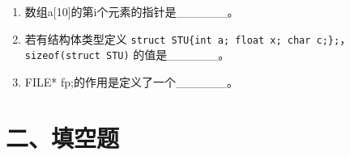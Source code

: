\documentclass[a4paper,12pt]{article}
\begin{document}
\begin{enumerate}
	\item 数组a[10]的第i个元素的指针是\_\_\_\_\_\_。
	      \vspace{0.3cm}

	\item 若有结构体类型定义 \texttt{struct STU\{int a; float x; char c;\};}，\texttt{sizeof(struct STU)} 的值是\_\_\_\_\_\_。
	      \vspace{0.3cm}

	\item FILE* fp;的作用是定义了一个\_\_\_\_\_\_。
	      \vspace{0.3cm}
\end{enumerate}

\section*{二、填空题}
\end{document}

